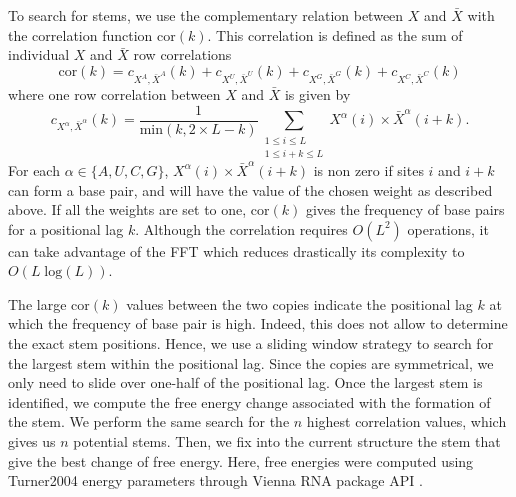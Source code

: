 \documentclass[a4paper,12pt]{article}
\begin{document}
To search for stems, we use the complementary relation between \(X\) and \(\bar{X}\)
with the correlation function \(\text{cor}(k)\). This correlation is defined as the sum
of individual \(X\) and \(\bar{X}\) row correlations
\begin{equation}
\text{cor}(k) = c_{X^A,\bar{X}^A}(k) + c_{X^U,\bar{X}^U}(k) + c_{X^G,\bar{X}^G}(k) + c_{X^C,\bar{X}^C}(k)
\end{equation}
where one row correlation between \(X\) and \(\bar{X}\) is given by
\begin{equation}
c_{X^\alpha,\bar{X}^\alpha}(k) = \frac{1}{\text{min}(k, 2 \times L-k)}\sum\limits_{\substack{1\leq i \leq L\\1 \leq i + k \leq L}} X^\alpha(i) \times \bar{X}^\alpha(i+k).
\end{equation}
For each \(\alpha \in \{A,U,C,G\}\), \(X^\alpha(i) \times \bar{X}^\alpha(i+k)\) is
non zero if sites \(i\) and \(i+k\) can form a base pair, and will have the value of
the chosen weight as described above. If all the weights are set to one,
\(\text{cor}(k)\) gives the frequency of base pairs for a positional lag \(k\).
Although the correlation requires \(O(L^2)\) operations, it can take advantage of
the FFT which reduces drastically its complexity to \(O(L\;\text{log}(L))\).

The large \(\text{cor}(k)\) values between the two copies indicate the positional
lag \(k\) at which the frequency of base pair is high. Indeed, this does not allow
to determine the exact stem positions. Hence, we use a sliding window strategy
to search for the largest stem within the positional lag. Since the copies are
symmetrical, we only need to slide over one-half of the positional lag. Once the
largest stem is identified, we compute the free energy change associated with
the formation of the stem. We perform the same search for the \(n\) highest
correlation values, which gives us \(n\) potential stems. Then, we fix into the
current structure the stem that give the best change of free energy. Here, free
energies were computed using Turner2004 energy parameters through Vienna RNA
package API \cite{lorenz11_vienn_packag}.
\end{document}
